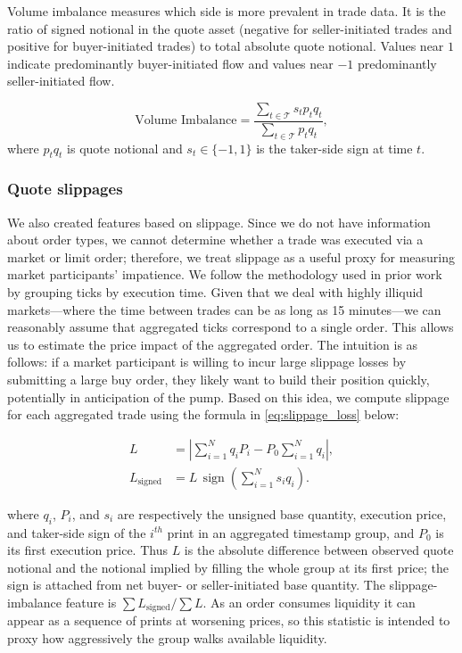 \documentclass{ieeeaccess}
\begin{document}
Volume imbalance measures which side is more prevalent in trade data. It is the ratio of signed notional in the quote asset (negative for seller-initiated trades and positive for buyer-initiated trades) to total absolute quote notional. Values near $1$ indicate predominantly buyer-initiated flow and values near $-1$ predominantly seller-initiated flow.

\begin{equation}
    \text{Volume Imbalance} = \frac{\sum_{t \in \mathcal{T}}s_t p_t q_t}{\sum_{t \in \mathcal{T}}p_t q_t},
    \label{eq:volume_imbalance}
\end{equation}
where $p_tq_t$ is quote notional and $s_t\in\{-1,1\}$ is the taker-side sign at time $t$.

\subsubsection{Quote slippages}

We also created features based on slippage. Since we do not have information about order types, we cannot determine whether a trade was executed via a market or limit order; therefore, we treat slippage as a useful proxy for measuring market participants’ impatience. We follow the methodology used in prior work by grouping ticks by execution time. Given that we deal with highly illiquid markets—where the time between trades can be as long as 15 minutes—we can reasonably assume that aggregated ticks correspond to a single order. This allows us to estimate the price impact of the aggregated order. The intuition is as follows: if a market participant is willing to incur large slippage losses by submitting a large buy order, they likely want to build their position quickly, potentially in anticipation of the pump. Based on this idea, we compute slippage for each aggregated trade using the formula in \eqref{eq:slippage_loss} below:

\begin{equation}
    \begin{aligned}
        L &= \left|\sum_{i=1}^{N} q_i P_i-P_0\sum_{i=1}^{N}q_i\right|, \\
        L_{\mathrm{signed}} &= L\,\operatorname{sign}\!\left(\sum_{i=1}^{N}s_iq_i\right).
    \end{aligned}
    \label{eq:slippage_loss}
\end{equation}

where $q_i$, $P_i$, and $s_i$ are respectively the unsigned base quantity, execution price, and taker-side sign of the $i^{th}$ print in an aggregated timestamp group, and $P_0$ is its first execution price. Thus $L$ is the absolute difference between observed quote notional and the notional implied by filling the whole group at its first price; the sign is attached from net buyer- or seller-initiated base quantity. The slippage-imbalance feature is $\sum L_{\mathrm{signed}}/\sum L$. As an order consumes liquidity it can appear as a sequence of prints at worsening prices, so this statistic is intended to proxy how aggressively the group walks available liquidity.
\end{document}

